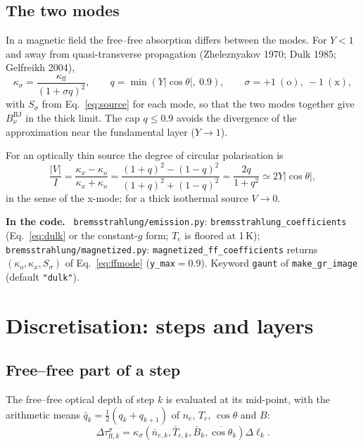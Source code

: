 \documentclass[11pt,a4paper]{article}
\newcommand{\code}[1]{\texttt{#1}}
\newenvironment{incode}{\par\smallskip\noindent\begin{minipage}{\linewidth}\small\color{accent!80!black}\textbf{In the code.}~}{\end{minipage}\par\smallskip}
\begin{document}
\subsection{The two modes}
In a magnetic field the free--free absorption differs between the modes. For $Y<1$ and away
from quasi-transverse propagation (Zheleznyakov 1970; Dulk 1985; Gelfreikh 2004),
\begin{equation}
  \kappa_\sigma=\frac{\kappa_\text{ff}}{\left(1+\sigma q\right)^2},\qquad
  q=\min\!\left(Y|\cos\theta|,\ 0.9\right),\qquad
  \sigma=+1\ (\text{o}),\ -1\ (\text{x}),
  \label{eq:ffmode}
\end{equation}
with $S_\sigma$ from Eq.~\eqref{eq:source} for each mode, so that the two modes together give
$B_\nu^\text{RJ}$ in the thick limit. The cap $q\le0.9$ avoids the divergence of the
approximation near the fundamental layer ($Y\to1$).

For an optically thin source the degree of circular polarisation is
\begin{equation}
  \frac{|V|}{I}=\frac{\kappa_x-\kappa_o}{\kappa_x+\kappa_o}
  =\frac{(1+q)^2-(1-q)^2}{(1+q)^2+(1-q)^2}=\frac{2q}{1+q^2}\simeq2Y|\cos\theta|,
  \label{eq:ffpol}
\end{equation}
in the sense of the x-mode; for a thick isothermal source $V\to0$.

\begin{incode}
\code{bremsstrahlung/emission.py}: \code{bremsstrahlung\_coefficients} (Eq.~\ref{eq:dulk} or
the constant-$g$ form; $T_e$ is floored at 1\,K); \code{bremsstrahlung/magnetized.py}:
\code{magnetized\_ff\_coefficients} returns $(\kappa_o,\kappa_x,S_\sigma)$ of
Eq.~\eqref{eq:ffmode} (\code{y\_max}$=0.9$). Keyword \code{gaunt} of \code{make\_gr\_image}
(default \code{"dulk"}).
\end{incode}

\section{Discretisation: steps and layers}\label{sec:layers}

\subsection{Free--free part of a step}
The free--free optical depth of step $k$ is evaluated at its mid-point, with the arithmetic
means $\bar q_k=\tfrac12(q_k+q_{k+1})$ of $n_e$, $T_e$, $\cos\theta$ and $B$:
\begin{equation}
  \Delta\tau^\sigma_{\text{ff},k}=\kappa_\sigma\!\left(\bar n_{e,k},\bar T_{e,k},\bar B_k,\overline{\cos\theta}_k\right)\Delta\ell_k .
\end{equation}
\end{document}
